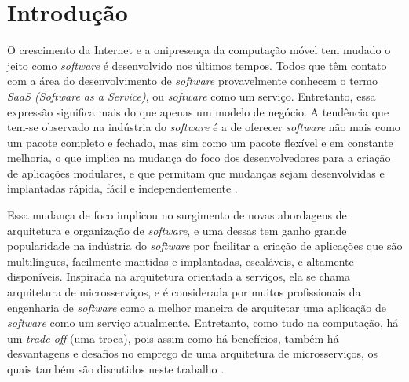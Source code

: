 \chapter{Introdução}\label{chapter-introducao}

O crescimento da Internet e a onipresença da computação móvel tem mudado o jeito como \emph{software} é desenvolvido nos últimos tempos. Todos que têm contato com a área do desenvolvimento de \emph{software} provavelmente conhecem o termo \emph{SaaS (Software as a Service)}, ou \emph{software} como um serviço. Entretanto, essa expressão significa mais do que apenas um modelo de negócio. A tendência que tem-se observado na indústria do \emph{software} é a de oferecer \emph{software} não mais como um pacote completo e fechado, mas sim como um pacote flexível e em constante melhoria, o que implica na mudança do foco dos desenvolvedores para a criação de aplicações modulares, e que permitam que mudanças sejam desenvolvidas e implantadas rápida, fácil e independentemente \cite{CAOPLE, oracle_microservices}.

Essa mudança de foco implicou no surgimento de novas abordagens de arquitetura e organização de \emph{software}, e uma dessas tem ganho grande popularidade na indústria do \emph{software} por facilitar a criação de aplicações que são multilíngues, facilmente mantidas e implantadas, escaláveis, e altamente disponíveis. Inspirada na arquitetura orientada a serviços, ela se chama arquitetura de microsserviços, e é considerada por muitos profissionais da engenharia de \emph{software} como a melhor maneira de arquitetar uma aplicação de \emph{software} como um serviço atualmente. Entretanto, como tudo na computação, há um \emph{trade-off} (uma troca), pois assim como há benefícios, também há desvantagens e desafios no emprego de uma arquitetura de microsserviços, os quais também são discutidos neste trabalho \cite{middleware-microservices,design-monitoring-testing-waseem}.




